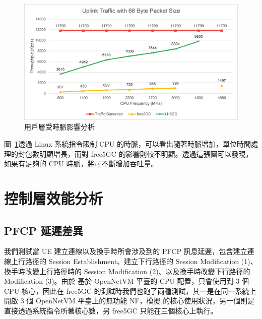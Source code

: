 \begin{figure}[htb]
    \centering
    \includegraphics[height=!,width=0.8\linewidth,keepaspectratio=true]{figures/up_cpu_clock}
    \caption[用戶層受時脈影響分析]{{\footnotesize 用戶層受時脈影響分析}}
    \label{fig:up_cpu_clock}
\end{figure}

圖~\ref{fig:up_cpu_clock}透過 Linux 系統指令限制 CPU 的時脈，可以看出隨著時脈增加，\LHCN 單位時間處理的封包數明顯增長，而對 free5GC 的影響則較不明顯。透過這張圖可以發現，如果有足夠的 CPU 時脈，\LHCN 將可不斷增加吞吐量。

\section{控制層效能分析}
\label{sec:cp_evaluation}

\subsection{PFCP 延遲差異}
\label{subsec:pfcp_comp}

我們測試當 UE 建立連線以及換手時所會涉及到的 PFCP 訊息延遲，包含建立連線上行路徑的 Session Establishment、建立下行路徑的 Session Modification (1)、換手時改變上行路徑時的 Session Modification (2)、以及換手時改變下行路徑的 Modification (3)。由於 \LHCN 基於 OpenNetVM 平臺的 CPU 配置，只會使用到 3 個 CPU 核心，因此在 free5GC 的測試時我們也跑了兩種測試，其一是在同一系統上開啟 3 個 OpenNetVM 平臺上的無功能 NF，模擬 \LHCN 的核心使用狀況，另一個則是直接透過系統指令所著核心數，另 free5GC 只能在三個核心上執行。

